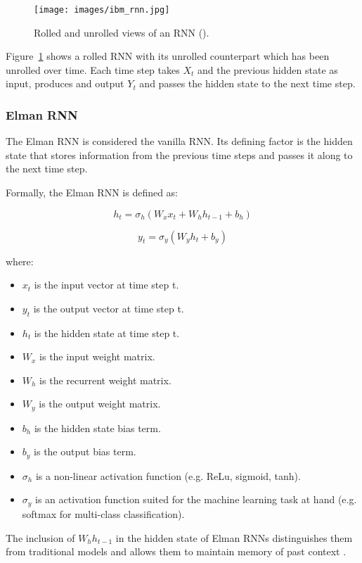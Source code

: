 \documentclass[conference]{IEEEtran}
\begin{document}
\begin{figure}[H]
  \centering
  \texttt{[image: images/ibm\_rnn.jpg]}
  \caption{Rolled and unrolled views of an RNN (\cite{ibm_rnn}).}
  \label{fig:ibm_rnn}
\end{figure}

Figure~\ref{fig:ibm_rnn} shows a rolled RNN with its unrolled counterpart which has been unrolled over time. Each time step takes $X_t$ and the previous hidden state as input, produces and output $Y_t$ and passes the hidden state to the next time step.

\subsubsection{\textbf{Elman RNN}}

The Elman RNN is considered the vanilla RNN. Its defining factor is the hidden state that stores information from the previous time steps and passes it along to the next time step.

Formally, the Elman RNN is defined as:

$$
h_t = \sigma_h(W_x x_t + W_h h_{t-1} + b_h)
$$

$$
y_t = \sigma_y(W_y h_t + b_y)
$$

where:

\begin{itemize}
    \item $x_t$ is the input vector at time step t.
    \item $y_t$ is the output vector at time step t.
    \item $h_t$ is the hidden state at time step t.
    \item $W_x$ is the input weight matrix.
    \item $W_h$ is the recurrent weight matrix.
    \item $W_y$ is the output weight matrix.
    \item $b_h$ is the hidden state bias term.
    \item $b_y$ is the output bias term.
    \item $\sigma_h$ is a non-linear activation function (e.g. ReLu, sigmoid, tanh).
    \item $\sigma_y$ is an activation function suited for the machine learning task at hand (e.g. softmax for multi-class classification).
\end{itemize}

The inclusion of $W_h h_{t-1}$ in the hidden state of Elman RNNs distinguishes them from traditional models and allows them to maintain memory of past context \cite{elman_rnn}.
\end{document}
